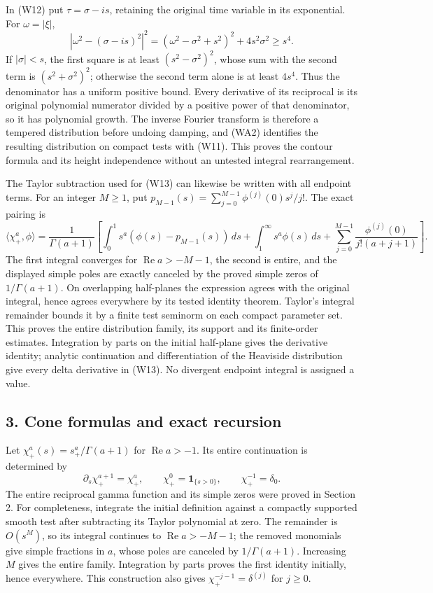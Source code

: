 \documentclass[
  11pt,
]{article}
\begin{document}
In (W12) put \(\tau=\sigma-i s\), retaining the original time variable
in its exponential. For \(\omega=|\xi|\), \[
 |\omega^2-(\sigma-is)^2|^2
   =(\omega^2-\sigma^2+s^2)^2+4s^2\sigma^2\geq s^4.
 \tag{WA4}
\] If \(|\sigma|<s\), the first square is at least \((s^2-\sigma^2)^2\),
whose sum with the second term is \((s^2+\sigma^2)^2\); otherwise the
second term alone is at least \(4s^4\). Thus the denominator has a
uniform positive bound. Every derivative of its reciprocal is its
original polynomial numerator divided by a positive power of that
denominator, so it has polynomial growth. The inverse Fourier transform
is therefore a tempered distribution before undoing damping, and (WA2)
identifies the resulting distribution on compact tests with (W11). This
proves the contour formula and its height independence without an
untested integral rearrangement.

The Taylor subtraction used for (W13) can likewise be written with all
endpoint terms. For an integer \(M\geq1\), put
\(p_{M-1}(s)=\sum_{j=0}^{M-1}\phi^{(j)}(0)s^j/j!\). The exact pairing is
\[
 \langle\chi_+^a,\phi\rangle=\frac1{\Gamma(a+1)}\left[
  \int_0^1s^a(\phi(s)-p_{M-1}(s))\,ds
  +\int_1^\infty s^a\phi(s)\,ds
  +\sum_{j=0}^{M-1}\frac{\phi^{(j)}(0)}{j!(a+j+1)}\right].
 \tag{WA5}
\] The first integral converges for \(\operatorname{Re}a>-M-1\), the
second is entire, and the displayed simple poles are exactly canceled by
the proved simple zeros of \(1/\Gamma(a+1)\). On overlapping half-planes
the expression agrees with the original integral, hence agrees
everywhere by its tested identity theorem. Taylor's integral remainder
bounds it by a finite test seminorm on each compact parameter set. This
proves the entire distribution family, its support and its finite-order
estimates. Integration by parts on the initial half-plane gives the
derivative identity; analytic continuation and differentiation of the
Heaviside distribution give every delta derivative in (W13). No
divergent endpoint integral is assigned a value.

\subsection{3. Cone formulas and exact
recursion}\label{cone-formulas-and-exact-recursion}

Let \(\chi_+^a(s)=s_+^a/\Gamma(a+1)\) for \(\operatorname{Re}a>-1\). Its
entire continuation is determined by \[
 \partial_s\chi_+^{a+1}=\chi_+^a,\qquad
 \chi_+^0=\boldsymbol1_{\{s>0\}},\qquad \chi_+^{-1}=\delta_0.
 \tag{W13}
\] The entire reciprocal gamma function and its simple zeros were proved
in Section 2. For completeness, integrate the initial definition against
a compactly supported smooth test after subtracting its Taylor
polynomial at zero. The remainder is \(O(s^M)\), so its integral
continues to \(\operatorname{Re}a>-M-1\); the removed monomials give
simple fractions in \(a\), whose poles are canceled by
\(1/\Gamma(a+1)\). Increasing \(M\) gives the entire family. Integration
by parts proves the first identity initially, hence everywhere. This
construction also gives \(\chi_+^{-j-1}=\delta^{(j)}\) for \(j\geq0\).
\end{document}
